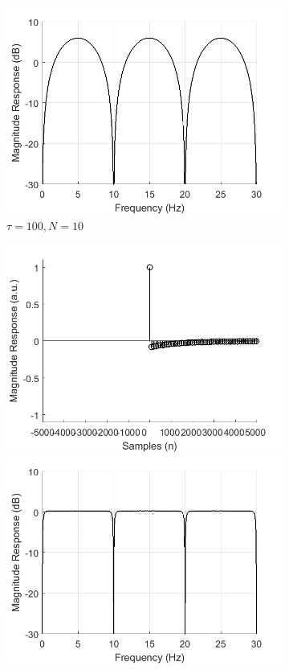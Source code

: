 \documentclass[a4paper]{article}
\begin{document}
\begin{figure}[hbtp]
\begin{subfigure}{.245\textwidth}
        \includegraphics[width=\textwidth]{img/tau/mag_exp_100.png}
        \caption{$\tau=100, N=10$}\label{fig:ExpTau100}
    \end{subfigure}
    \begin{subfigure}{.245\textwidth}
        \includegraphics[width=\textwidth]{img/np/kernel_exp_50.png}\\
        \includegraphics[width=\textwidth]{img/np/mag_exp_50.png}

\end{subfigure}
\end{figure}
\end{document}
